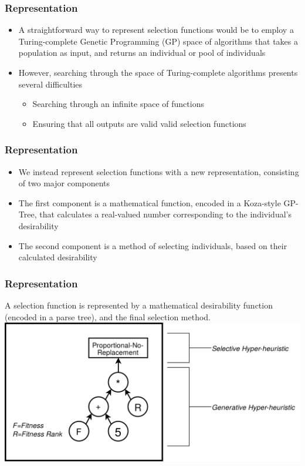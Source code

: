 \documentclass{beamer}
\begin{document}
	
	\begin{frame}
		\frametitle{Representation}
		\begin{itemize}
			 \item<1-|alert@1> A straightforward way to represent selection functions would be to employ a Turing-complete Genetic Programming (GP) space of algorithms that takes a population as input, and returns an individual or pool of individuals
			 \item<2-|alert@2> However, searching through the space of Turing-complete algorithms presents several difficulties
			 \begin{itemize}
			 	\item<3-|alert@3> Searching through an infinite space of functions
			 	\item<4-|alert@4> Ensuring that all outputs are valid valid selection functions
			\end{itemize}			 		 
		
		\end{itemize}	
	\end{frame}			
	
	
	\begin{frame}
		\frametitle{Representation}
		
		\begin{itemize}
			 \item<1-|alert@1> We instead represent selection functions with a new representation, consisting of two major components
			 \item<2-|alert@2> The first component is a mathematical function, encoded in a Koza-style GP-Tree, that calculates a real-valued number corresponding to the individual's desirability
			 \item<3-|alert@3> The second component is a method of selecting individuals, based on their calculated desirability
		
		\end{itemize}
	\end{frame}
	
	\begin{frame}
		\frametitle{Representation}
		A selection function is represented by a mathematical desirability function (encoded in a parse tree), and the final selection method.
		\includegraphics[width=\textwidth]{example_eppsea}
	\end{frame}
	
\end{document}
